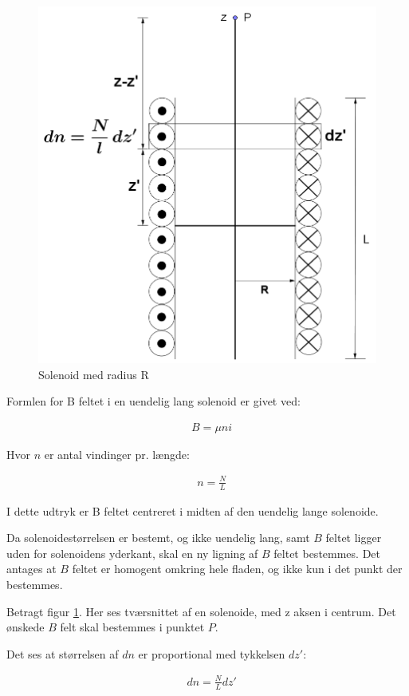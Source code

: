 \begin{figure}[h!]
	\centering
	\includegraphics[width=.7\textwidth]{billeder/B_felt2.png}
	\caption{Solenoid med radius R}
	\label{fig:spole_fig2}
\end{figure}

Formlen for B feltet i en uendelig lang solenoid er givet ved:

\begin{align}
	&B=\mu ni
\end{align}

Hvor $n$ er antal vindinger pr. længde:


\begin{align}
	&n=\frac{N}{L}
\end{align}

I dette udtryk er B feltet centreret i midten af den uendelig lange solenoide.

Da solenoidestørrelsen er bestemt, og ikke uendelig lang, samt $B$ feltet ligger uden for solenoidens yderkant, skal en ny ligning af $B$ feltet bestemmes.
Det antages at $B$ feltet er homogent omkring hele fladen, og ikke kun i det punkt der bestemmes.


Betragt figur \ref{fig:spole_fig2}. Her ses tværsnittet af en solenoide, med z aksen i centrum. Det ønskede $B$ felt skal bestemmes i punktet $P$.

Det ses at størrelsen af $dn$ er proportional med tykkelsen $dz'$:

\begin{align}
	&dn=\frac{N}{L} dz'
\end{align}



